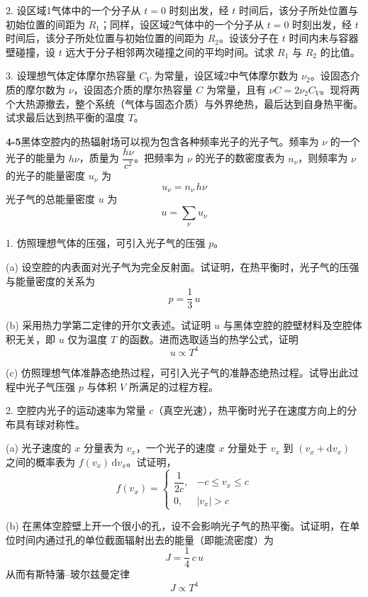 2. 设区域1气体中的一个分子从 $t = 0$ 时刻出发，经 $t$ 时间后，该分子所处位置与初始位置的间距为 $R_{1}$；同样，设区域2气体中的一个分子从 $t = 0$ 时刻出发，经 $t$ 时间后，该分子所处位置与初始位置的间距为 $R_{2}$。设该分子在 $t$ 时间内未与容器壁碰撞，设 $t$ 远大于分子相邻两次碰撞之间的平均时间。试求 $R_{1}$ 与 $R_{2}$ 的比值。

3. 设理想气体定体摩尔热容量 $C_{V}$ 为常量，设区域2中气体摩尔数为 $\nu_{2}$。设固态介质的摩尔数为 $\nu$，设固态介质的摩尔热容量 $C$ 为常量，且有 $\nu C = 2\nu_{2}C_{V}$。现将两个大热源撤去，整个系统（气体与固态介质）与外界绝热，最后达到自身热平衡。试求最后达到热平衡的温度 $T$。
\vfill

\textbf{4-5}\quad 黑体空腔内的热辐射场可以视为包含各种频率光子的光子气。频率为 $\nu$ 的一个光子的能量为 $h\nu$，质量为 $\dfrac{h\nu}{c^{2}}$。把频率为 $\nu$ 的光子的数密度表为 $n_{\nu}$，则频率为 $\nu$ 的光子的能量密度 $u_{\nu}$ 为
$$
u_{\nu} = n_{\nu}\, h\nu
$$
光子气的总能量密度 $u$ 为
$$
u = \sum_{\nu} u_{\nu}
$$

1. 仿照理想气体的压强，可引入光子气的压强 $p$。

(a) 设空腔的内表面对光子气为完全反射面。试证明，在热平衡时，光子气的压强与能量密度的关系为
$$
p = \frac{1}{3}\,u
$$

(b) 采用热力学第二定律的开尔文表述。试证明 $u$ 与黑体空腔的腔壁材料及空腔体积无关，即 $u$ 仅为温度 $T$ 的函数。进而选取适当的热学公式，证明
$$
u \propto T^{4}
$$

(c) 仿照理想气体准静态绝热过程，可引入光子气的准静态绝热过程。试导出此过程中光子气压强 $p$ 与体积 $V$ 所满足的过程方程。

2. 空腔内光子的运动速率为常量 $c$（真空光速），热平衡时光子在速度方向上的分布具有球对称性。

(a) 光子速度的 $x$ 分量表为 $v_{x}$，一个光子的速度 $x$ 分量处于 $v_{x}$ 到 $(v_{x} + \mathrm{d}v_{x})$ 之间的概率表为 $f(v_{x})\,\mathrm{d}v_{x}$。试证明，
$$
f(v_{x}) = \left\{\begin{array}{ll}
\dfrac{1}{2c}, & -c \leqslant v_{x} \leqslant c \\[6pt]
0, & |v_{x}| > c
\end{array}\right.
$$

(b) 在黑体空腔壁上开一个很小的孔，设不会影响光子气的热平衡。试证明，在单位时间内通过孔的单位截面辐射出去的能量（即能流密度）为
$$
J = \frac{1}{4}\,c\,u
$$
从而有斯特藩--玻尔兹曼定律
$$
J \propto T^{4}
$$

\vfill


